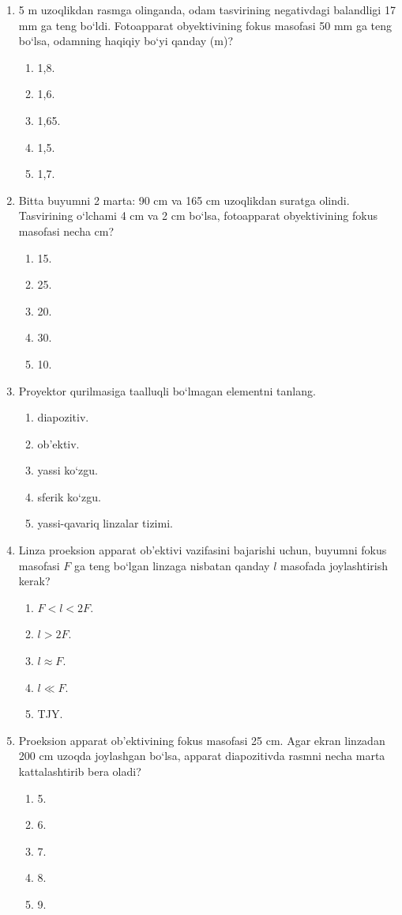 \begin{enumerate}
\item 5 m uzoqlikdan rasmga olinganda, odam tasvirining negativdagi balandligi 17 mm ga teng bo‘ldi. Fotoapparat obyektivining fokus masofasi 50 mm ga teng bo‘lsa, odamning haqiqiy bo‘yi qanday (m)?
\begin{enumerate}[label=\Alph*)]
\item 1,8.
\item 1,6.
\item 1,65.
\item 1,5.
\item 1,7.
\end{enumerate}

\item Bitta buyumni 2 marta: 90 cm va 165 cm uzoqlikdan suratga olindi. Tasvirining o‘lchami 4 cm va 2 cm bo‘lsa, fotoapparat obyektivining fokus masofasi necha cm?
\begin{enumerate}[label=\Alph*)]
\item 15.
\item 25.
\item 20.
\item 30.
\item 10.
\end{enumerate}

\item Proyektor qurilmasiga taalluqli bo‘lmagan elementni tanlang.
\begin{enumerate}[label=\Alph*)]
\item diapozitiv.
\item ob’ektiv.
\item yassi ko‘zgu.
\item sferik ko‘zgu.
\item yassi-qavariq linzalar tizimi.
\end{enumerate}

\item Linza proeksion apparat ob’ektivi vazifasini bajarishi uchun, buyumni fokus masofasi $F$ ga teng bo‘lgan linzaga nisbatan qanday $l$ masofada joylashtirish kerak?
\begin{enumerate}[label=\Alph*)]
\item $F<l<2F$.
\item $l>2F$.
\item $l\approx F$.
\item $l\ll F$.
\item TJY.
\end{enumerate}

\item Proeksion apparat ob’ektivining fokus masofasi 25 cm. Agar ekran linzadan 200 cm uzoqda joylashgan bo‘lsa, apparat diapozitivda rasmni necha marta kattalashtirib bera oladi?
\begin{enumerate}[label=\Alph*)]
\item 5.
\item 6.
\item 7.
\item 8.
\item 9.
\end{enumerate}


\end{enumerate}
